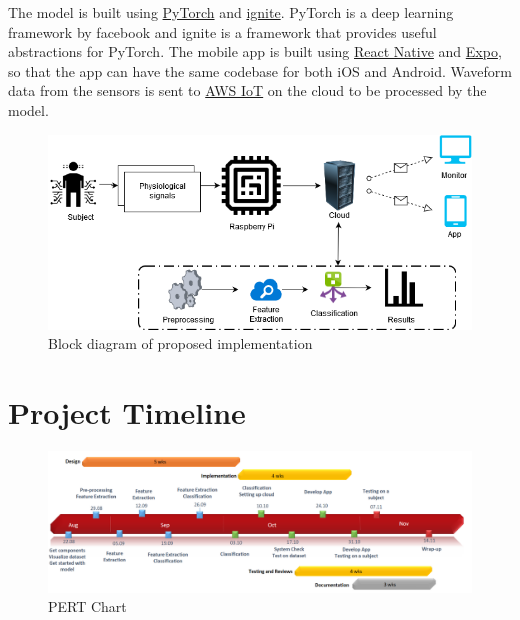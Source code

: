 \documentclass[11pt]{article}
\theoremstyle{definition}
\begin{document}
The model is built using \href{https://github.com/pytorch/pytorch}{PyTorch} and \href{https://github.com/pytorch/ignite}{ignite}. PyTorch is a deep learning framework by facebook and ignite is a framework that provides useful abstractions for PyTorch. The mobile app is built using \href{https://facebook.github.io/react-native/}{React Native} and \href{https://expo.io/}{Expo}, so that the app can have the same codebase for both iOS and Android. Waveform data from the sensors is sent to \href{https://aws.amazon.com/iot/}{AWS IoT} on the cloud to be processed by the model.

    \begin{figure}[h]
      \centering
      \includegraphics[width=\textwidth, scale=1.5]{schematic}
      \caption{Block diagram of proposed implementation}
    \end{figure}
  
  \newpage
  \section{Project Timeline}
    \begin{figure}[h]
      \centering
      \includegraphics[width=\textwidth, scale=1.5]{pert_chart}
      \caption{PERT Chart}
    \end{figure}
  
  \newpage
  
  
\end{document}
